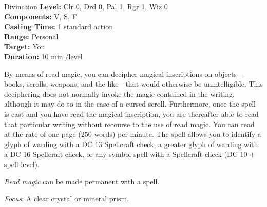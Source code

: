 {Divination}
{
	\textbf{Level:}
	Clr 0, Drd 0, Pal 1, Rgr 1, Wiz 0\\
	\textbf{Components:}
	V, S, F\\
	\textbf{Casting Time:}
	1 standard action\\
	\textbf{Range:}
	Personal\\
	\textbf{Target:}
	You\\
	\textbf{Duration:}
	10 min./level\\
}
{
	By means of read magic, you can decipher magical inscriptions on objects---books, scrolls, weapons, and the like---that would otherwise be unintelligible. This deciphering does not normally invoke the magic contained in the writing, although it may do so in the case of a cursed scroll. Furthermore, once the spell is cast and you have read the magical inscription, you are thereafter able to read that particular writing without recourse to the use of read magic. You can read at the rate of one page (250 words) per minute. The spell allows you to identify a glyph of warding with a DC 13 Spellcraft check, a greater glyph of warding with a DC 16 Spellcraft check, or any symbol spell with a Spellcraft check (DC 10 + spell level).

	\emph{Read magic} can be made permanent with a  spell.

	\textit{Focus}:
	A clear crystal or mineral prism.

}
